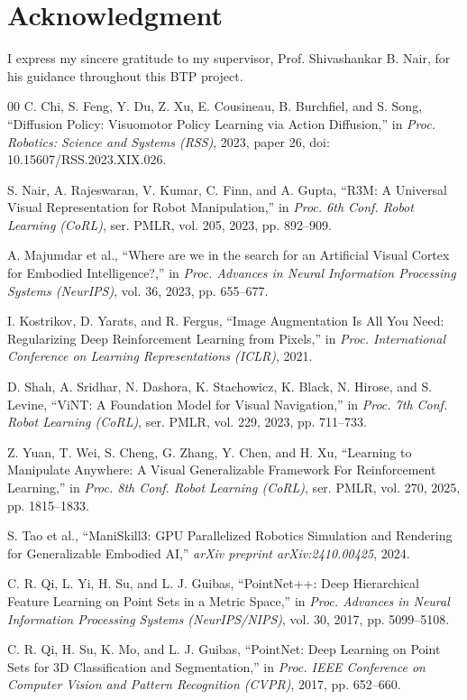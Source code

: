 \documentclass[conference]{IEEEtran}
\begin{document}
\section*{Acknowledgment}
I express my sincere gratitude to my supervisor, Prof. Shivashankar B. Nair, for his guidance throughout this BTP project.

\newpage
\begin{thebibliography}{00}
 C. Chi, S. Feng, Y. Du, Z. Xu, E. Cousineau, B. Burchfiel, and S. Song, ``Diffusion Policy: Visuomotor Policy Learning via Action Diffusion,'' in \textit{Proc. Robotics: Science and Systems (RSS)}, 2023, paper 26, doi: 10.15607/RSS.2023.XIX.026.

 S. Nair, A. Rajeswaran, V. Kumar, C. Finn, and A. Gupta, ``R3M: A Universal Visual Representation for Robot Manipulation,'' in \textit{Proc. 6th Conf. Robot Learning (CoRL)}, ser. PMLR, vol. 205, 2023, pp. 892--909.

 A. Majumdar et al., ``Where are we in the search for an Artificial Visual Cortex for Embodied Intelligence?,'' in \textit{Proc. Advances in Neural Information Processing Systems (NeurIPS)}, vol. 36, 2023, pp. 655--677.

 I. Kostrikov, D. Yarats, and R. Fergus, ``Image Augmentation Is All You Need: Regularizing Deep Reinforcement Learning from Pixels,'' in \textit{Proc. International Conference on Learning Representations (ICLR)}, 2021.

 D. Shah, A. Sridhar, N. Dashora, K. Stachowicz, K. Black, N. Hirose, and S. Levine, ``ViNT: A Foundation Model for Visual Navigation,'' in \textit{Proc. 7th Conf. Robot Learning (CoRL)}, ser. PMLR, vol. 229, 2023, pp. 711--733.

 Z. Yuan, T. Wei, S. Cheng, G. Zhang, Y. Chen, and H. Xu, ``Learning to Manipulate Anywhere: A Visual Generalizable Framework For Reinforcement Learning,'' in \textit{Proc. 8th Conf. Robot Learning (CoRL)}, ser. PMLR, vol. 270, 2025, pp. 1815--1833.

 S. Tao et al., ``ManiSkill3: GPU Parallelized Robotics Simulation and Rendering for Generalizable Embodied AI,'' \textit{arXiv preprint arXiv:2410.00425}, 2024.

 C. R. Qi, L. Yi, H. Su, and L. J. Guibas, ``PointNet++: Deep Hierarchical Feature Learning on Point Sets in a Metric Space,'' in \textit{Proc. Advances in Neural Information Processing Systems (NeurIPS/NIPS)}, vol. 30, 2017, pp. 5099--5108.

 C. R. Qi, H. Su, K. Mo, and L. J. Guibas, ``PointNet: Deep Learning on Point Sets for 3D Classification and Segmentation,'' in \textit{Proc. IEEE Conference on Computer Vision and Pattern Recognition (CVPR)}, 2017, pp. 652--660.
\end{thebibliography}
\end{document}
